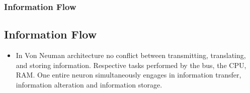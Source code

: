 \documentclass{beamer}
\begin{document}
\begin{frame}
\frametitle{Information Flow}
\subsection{Information Flow}
\begin{itemize}
\vfill \item In Von Neuman architecture no conflict between transmitting, translating, and storing information. %
Respective tasks performed by the bus, the CPU, RAM. One entire neuron simultaneously engages in information transfer, information alteration and information storage. 
\end{itemize}


\end{frame}
\end{document}
